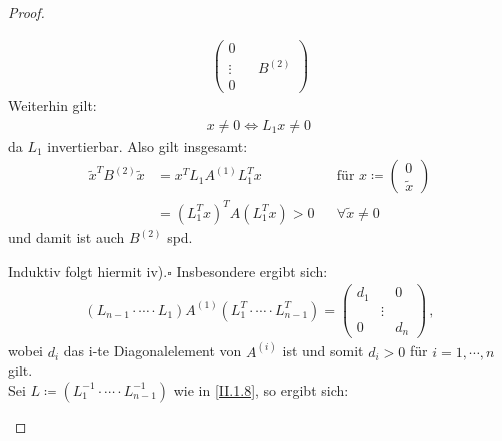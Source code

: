 \documentclass[ngerman,fontsize=11pt, paper=a4, parskip=half, titlepage=true, toc=bib]{scrbook}
\begin{document}
\begin{proof}
\begin{enumerate}[i)]
\begin{align*}
\begin{pmatrix}
                  0 \\
                  \vdots && B^{(2)} \\ 
                  0
                \end{pmatrix} 
      \end{align*}
      Weiterhin gilt:
      \begin{gather*}
        x\neq 0 \Leftrightarrow L_1 x\neq 0 \,
      \end{gather*}
      da $L_1$ invertierbar. Also gilt insgesamt:
      \begin{align*}
        \widetilde{x}^TB^{(2)} \widetilde{x} &= x^T L_1A^{(1)}L_1^Tx
        &&  \text{für } x\coloneqq \begin{pmatrix}	0 \\ \widetilde{x}\end{pmatrix}\\
                                             &= (L_1^Tx)^TA(L_1^Tx) > 0
        && \forall \widetilde{x}\neq 0 
      \end{align*}
      und damit ist auch $B^{(2)}$ spd.
      
      Induktiv folgt hiermit iv).\hfill $\square$
      Insbesondere ergibt sich: 
      \begin{gather*}
        (L_{n-1}\cdot \cdots\cdot L_1)A^{(1)}(L_1^T\cdot \cdots \cdot L_{n-1}^T) 
        = \begin{pmatrix} d_1 & & 0 \\ &\vdots& \\ 0&& d_n\end{pmatrix} \, ,
      \end{gather*}
      wobei $d_i$ das i-te Diagonalelement von $A^{(i)}$ ist und somit $d_i>0$ für $ i= 1, \cdots , n$ gilt. \\
      
      Sei $L\coloneqq (L_1^{-1}\cdot \cdots \cdot L_{n-1}^{-1})$ wie in \eqref{II.1.8}, so ergibt sich:
    \end{enumerate}
  \end{proof}		
\end{document}
